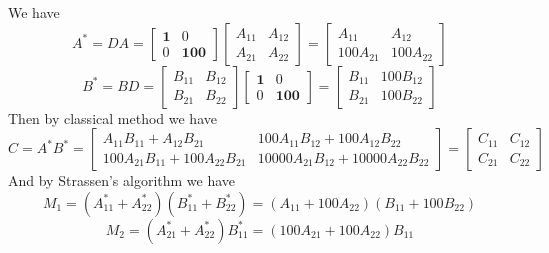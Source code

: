 \documentclass{article}
\begin{document}
We have 
\begin{equation}
    A^{*} = DA = \begin{bmatrix}
        \mathbf{1} & 0\\
        0 & \mathbf{100}
    \end{bmatrix} \begin{bmatrix}
        A_{11} & A_{12}\\
        A_{21} & A_{22}
    \end{bmatrix} = \begin{bmatrix}
        A_{11} & A_{12}\\
        100A_{21} & 100A_{22}
    \end{bmatrix}
\end{equation}
\begin{equation}
    B^{*} = BD = \begin{bmatrix}
        B_{11} & B_{12}\\
        B_{21} & B_{22}
    \end{bmatrix} \begin{bmatrix}
        \mathbf{1} & 0\\
        0 & \mathbf{100}
    \end{bmatrix} = \begin{bmatrix}
        B_{11} & 100B_{12}\\
        B_{21} & 100B_{22}
    \end{bmatrix}
\end{equation}
Then by classical method we have
\begin{equation}
    C = A^{*}B^{*} = \begin{bmatrix}
        A_{11}B_{11} + A_{12}B_{21} & 100A_{11}B_{12} + 100A_{12}B_{22}\\
        100A_{21}B_{11} + 100A_{22}B_{21} & 10000A_{21}B_{12} + 10000A_{22}B_{22}
    \end{bmatrix}
    = \begin{bmatrix}
        C_{11} & C_{12}\\
        C_{21} & C_{22}
    \end{bmatrix}
\end{equation}
And by Strassen's algorithm we have
\begin{equation}
    M_1 = (A^{*}_{11} + A^{*}_{22})(B^{*}_{11} + B^{*}_{22}) = 
    (A_{11} + 100A_{22})(B_{11} + 100B_{22})
\end{equation}
\begin{equation}
    M_2 = (A^{*}_{21} + A^{*}_{22})B^{*}_{11} = 
    (100A_{21} + 100A_{22})B_{11}
\end{equation}
\end{document}
